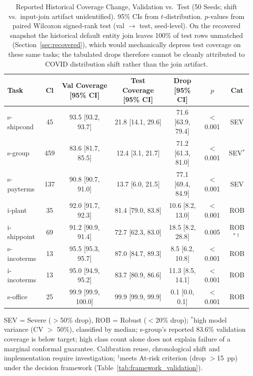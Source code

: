 \documentclass[accepted]{uai2026} %
\begin{document}
\begin{table}[t]
\centering
\caption{Reported Historical Coverage Change, Validation vs.\ Test (50 Seeds;
shift vs.\ input-join artifact unidentified). 95\% CIs from $t$-distribution.
$p$-values from paired Wilcoxon signed-rank test (val $\rightarrow$ test,
seed-level). On the recovered snapshot the historical default entity join leaves
100\% of test rows unmatched (Section~\ref{sec:recovered}), which would
mechanically depress test coverage on these same tasks; the tabulated drops
therefore cannot be cleanly attributed to COVID distribution shift rather than
the join artifact.}\label{tab:main_results}
\small
\begin{tabular}{@{}lcccccc@{}}
\toprule
Task & Cl & Val Coverage [95\% CI] & Test Coverage [95\% CI] & Drop [95\% CI] & $p$ & Cat \\
\midrule
s-shipcond & 45 & 93.5 [93.2, 93.7] & 21.8 [14.1, 29.6] & 71.6 [63.9, 79.4] & $<$0.001 & SEV \\
s-group & 459 & 83.6 [81.7, 85.5] & 12.4 [3.1, 21.7] & 71.2 [61.3, 81.0] & $<$0.001 & SEV$^*$ \\
s-payterms & 137 & 90.8 [90.7, 91.0] & 13.7 [6.0, 21.5] & 77.1 [69.4, 84.9] & $<$0.001 & SEV \\
i-plant & 35 & 92.0 [91.7, 92.3] & 81.4 [79.0, 83.8] & 10.6 [8.2, 13.0] & $<$0.001 & ROB \\
i-shippoint & 69 & 91.2 [90.9, 91.4] & 72.7 [62.3, 83.0] & 18.5 [8.2, 28.8] & 0.005 & ROB$^{*\dagger}$ \\
s-incoterms & 13 & 95.5 [95.3, 95.7] & 87.0 [84.7, 89.3] & 8.5 [6.2, 10.8] & $<$0.001 & ROB \\
i-incoterms & 13 & 95.0 [94.9, 95.2] & 83.7 [80.9, 86.6] & 11.3 [8.5, 14.1] & $<$0.001 & ROB \\
s-office & 25 & 99.9 [99.9, 100.0] & 99.9 [99.9, 99.9] & 0.1 [0.0, 0.1] & $<$0.001 & ROB \\
\bottomrule
\end{tabular}


\raggedright
\footnotesize
SEV = Severe ($>$50\% drop), ROB = Robust ($<$20\% drop); $^*$high model variance (CV $>$ 50\%), classified by median; s-group's reported 83.6\% validation coverage is below target; high class count alone does not explain failure of a marginal conformal guarantee. Calibration reuse, chronological shift and implementation require investigation; $^\dagger$meets At-risk criterion (drop $>$15~pp) under the decision framework (Table~\ref{tab:framework_validation}).
\end{table}
\end{document}

